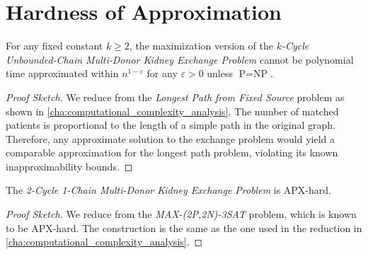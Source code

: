 \section{Hardness of Approximation}


\begin{lemma}
For any fixed constant $k \ge 2$, the maximization version of the \textit{$k$-Cycle Unbounded-Chain Multi-Donor Kidney Exchange Problem} cannot be polynomial time approximated
within $n^{1-\varepsilon}$ for any $\varepsilon  > 0$ unless $\text{P} = \text{NP}$.
\end{lemma}

\begin{proof}[Proof Sketch]
We reduce from the \textit{Longest Path from Fixed Source} problem as shown in \autoref{cha:computational_complexity_analysis}. The number of matched patients is proportional to the length of a simple path in the original graph. Therefore, any approximate solution to the exchange problem would yield a comparable approximation for the longest path problem, violating its known inapproximability bounds.
\end{proof}

\begin{lemma}
The \textit{2-Cycle 1-Chain Multi-Donor Kidney Exchange Problem} is APX-hard.
\end{lemma}

\begin{proof}[Proof Sketch]
We reduce from the \textit{MAX-(2P,2N)-3SAT} problem, which is known to be APX-hard. The construction is the same as the one used in the reduction in \autoref{cha:computational_complexity_analysis}. 
\end{proof}



